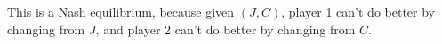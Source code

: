 \documentclass[12pt]{article}
\begin{document}
This is a Nash equilibrium, because given $(J,C)$, player 1 can't do better by changing from $J$, and player 2 can't do
better by changing from $C$.

\problem

\problemsub

\problemsub

\problemsub

\problemsub

\problemsub

\problemsub

\problemsub

\problemsub

\problemsub

\problemsub

\problemsub
\end{document}
